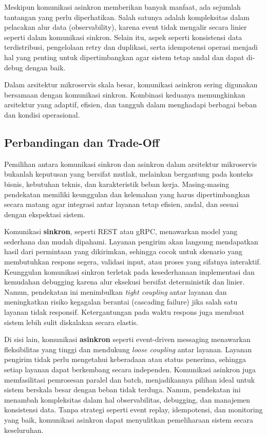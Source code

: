 Meskipun komunikasi asinkron memberikan banyak manfaat, ada sejumlah tantangan yang perlu diperhatikan. Salah satunya adalah kompleksitas dalam pelacakan alur data (observability), karena event tidak mengalir secara linier seperti dalam komunikasi sinkron. Selain itu, aspek seperti konsistensi data terdistribusi, pengelolaan retry dan duplikasi, serta idempotensi operasi menjadi hal yang penting untuk dipertimbangkan agar sistem tetap andal dan dapat di-debug dengan baik.

Dalam arsitektur mikroservis skala besar, komunikasi asinkron sering digunakan ber\-samaan dengan komunikasi sinkron. Kombinasi keduanya memungkinkan arsitektur yang adaptif, efisien, dan tangguh dalam menghadapi berbagai beban dan kondisi operasional.

\subsection{Perbandingan dan Trade-Off}

Pemilihan antara komunikasi sinkron dan asinkron dalam arsitektur mikroservis bukanlah keputusan yang bersifat mutlak, melainkan bergantung pada konteks bisnis, kebutuhan teknis, dan karakteristik beban kerja. Masing-masing pendekatan memiliki keunggulan dan kelemahan yang harus dipertimbangkan secara matang agar integrasi antar layanan tetap efisien, andal, dan sesuai dengan ekspektasi sistem.

Komunikasi \textbf{sinkron}, seperti REST atau gRPC, menawarkan model yang sederhana dan mudah dipahami. Layanan pengirim akan langsung mendapatkan hasil dari permintaan yang dikirimkan, sehingga cocok untuk skenario yang membutuhkan respons segera, validasi input, atau proses yang sifatnya interaktif. Keunggulan komunikasi sinkron terletak pada kesederhanaan implementasi dan kemudahan debugging karena alur eksekusi bersifat deterministik dan linier. Namun, pendekatan ini menimbulkan \textit{tight coupling} antar layanan dan meningkatkan risiko kegagalan berantai (cascading failure) jika salah satu layanan tidak responsif. Ketergantungan pada waktu respons juga membuat sistem lebih sulit diskalakan secara elastis.

Di sisi lain, komunikasi \textbf{asinkron} seperti event-driven messaging menawarkan fleksibilitas yang tinggi dan mendukung \textit{loose coupling} antar layanan. Layanan pengirim tidak perlu mengetahui keberadaan atau status penerima, sehingga setiap layanan dapat berkembang secara independen. Komunikasi asinkron juga memfasilitasi pemrosesan paralel dan batch, menjadikannya pilihan ideal untuk sistem berskala besar dengan beban tidak terduga. Namun, pendekatan ini menambah kompleksitas dalam hal observabilitas, debugging, dan manajemen konsistensi data. Tanpa strategi seperti event replay, idempotensi, dan monitoring yang baik, komunikasi asinkron dapat menyulitkan pemeliharaan sistem secara keseluruhan.

